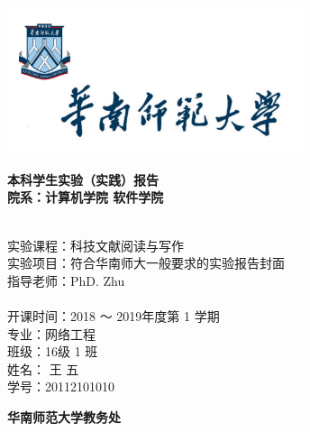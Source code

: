\documentclass[10.5pt,a4paper,headings]{ctexart}
\newcommand{\titleline}[1]{\hspace*{6em} #1 \\}
\begin{document}
\begin{titlepage}
\scshape


\begin{center}
\vspace*{0.6cm}
\includegraphics[width=0.65\textwidth]{./logo.jpg}

\doublespacing
\fontsize{18pt}{2em}\bf 
本科学生实验（实践）报告\\
\vspace{1em}
院系：计算机学院 
\hspace{2ex}
软件学院
\end{center}

\begin{flushleft}

\setlength{\parindent}{2em}
\bf
{\fontsize{14pt}{18pt}

\linespread{1.5}\selectfont
~\\
\titleline{实验课程：科技文献阅读与写作}

\titleline{实验项目：符合华南师大一般要求的实验报告封面}

\titleline{指导老师：PhD. Zhu}
~\\
\titleline{开课时间：2018 ～ 2019年度第 1 学期}

\titleline{专\hspace{2em}业：网络工程}

\titleline{班\hspace{2em}级：16级 1 班}

\titleline{姓\hspace{2em}名： 王 五}

\titleline{学\hspace{2em}号：20112101010}
}
\end{flushleft}

\begin{center}
\vspace{3cm}
\fontsize{14pt}{21pt}
\bf 华南师范大学教务处
\end{center}

\end{titlepage}
\end{document}
